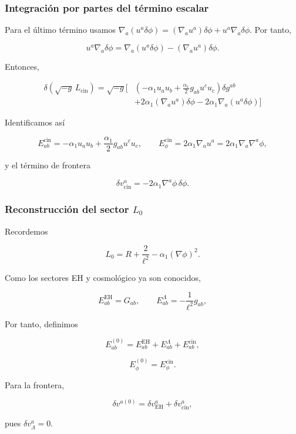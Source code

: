 \documentclass{beamer}
\newcommand{\DenseDisplaySpacing}{%
\setlength{\abovedisplayskip}{1pt}%
\setlength{\belowdisplayskip}{1pt}%
\setlength{\abovedisplayshortskip}{0pt}%
\setlength{\belowdisplayshortskip}{0pt}%
\setlength{\jot}{1pt}%
}
\begin{document}
\begin{frame}[label=nav-frame-095]
\frametitle{Integración por partes del término escalar}
\small
\linespread{.94}\selectfont\DenseDisplaySpacing

Para el último término usamos $\nabla_a(u^a\delta\phi) = (\nabla_a u^a)\delta\phi + u^a\nabla_a\delta\phi$. Por tanto,

\[
u^a\nabla_a\delta\phi
=
\nabla_a(u^a\delta\phi)
-
(\nabla_a u^a)\delta\phi.
\]


Entonces,

\begin{align*}
\delta(\sqrt{-g}\,L_{\mathrm{cin}})
=
\sqrt{-g}\Bigg[
&
\left(
-\alpha_1u_a u_b
+
\frac{\alpha_1}{2}g_{ab}u^cu_c
\right)\delta g^{ab}
\\
&
+
2\alpha_1(\nabla_a u^a)\delta\phi
-
2\alpha_1\nabla_a(u^a\delta\phi)
\Bigg]
\end{align*}


Identificamos así

\[
\boxed{
E^{\mathrm{cin}}_{ab} = -\alpha_1u_a u_b + \frac{\alpha_1}{2}g_{ab}u^cu_c,
\qquad
E^{\mathrm{cin}}_{\phi} = 2\alpha_1\nabla_a u^a = 2\alpha_1\nabla_a\nabla^a\phi,
}
\]

y el término de frontera

\[
\boxed{
\delta v^a_{\mathrm{cin}}
=
-2\alpha_1\nabla^a\phi\,\delta\phi.
}
\]

\end{frame}


\begin{frame}[label=nav-frame-096]
\frametitle{Reconstrucción del sector \(L_0\)}
\small

Recordemos

\[
L_0
=
R+\frac{2}{\ell^2}-\alpha_1(\nabla\phi)^2.
\]

Como los sectores EH y cosmológico ya son conocidos,

\[
E^{\mathrm{EH}}_{ab}=G_{ab},
\qquad
E^\Lambda_{ab}
=
-\frac{1}{\ell^2}g_{ab},
\]

Por tanto, definimos

\[
E^{(0)}_{ab}
=
E^{\mathrm{EH}}_{ab}
+
E^\Lambda_{ab}
+
E^{\mathrm{cin}}_{ab},
\]

\[
E^{(0)}_\phi
=
E^{\mathrm{cin}}_\phi.
\]

Para la frontera,

\[
\delta v^{a(0)}
=
\delta v^a_{\mathrm{EH}}
+
\delta v^a_{\mathrm{cin}},
\]

pues $\delta v^a_\Lambda=0$.

\end{frame}
\end{document}

